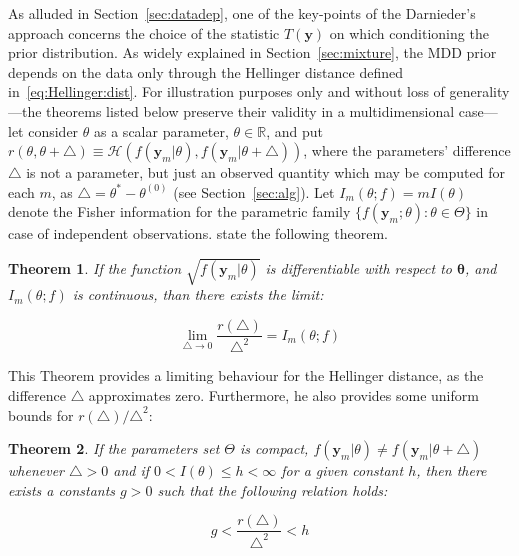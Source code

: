 \documentclass{statsoc}
\newtheorem{thm}{Theorem}
\begin{document}
 As alluded in Section~\ref{sec:datadep}, one of the key-points of the Darnieder's approach concerns the choice of the statistic $T(\bm{y})$ on which conditioning the prior distribution. As widely explained in Section~\ref{sec:mixture}, the MDD prior depends on the data only through the Hellinger distance defined in~\eqref{eq:Hellinger:dist}. For illustration purposes only and without loss of generality ---the theorems listed below preserve their validity in a multidimensional case--- let consider $\theta$ as a scalar parameter, $\theta \in \mathbb{R}$, and put $r(\theta, \theta + \triangle) \equiv \mathcal{H}( f(\bm{y}_{m}|\theta), f(\bm{y}_{m}|\theta+\triangle))$, where the parameters' difference $\triangle$  is not a parameter, but just an observed quantity which may be computed for each $m$, as $\triangle=\theta^{*}-\theta^{(0)}$ (see Section~\ref{sec:alg}). Let $I_{m}(\theta;f)=mI(\theta) $ denote the Fisher information for the parametric family $\{f(\bm{y}_{m}; \theta): \theta \in \Theta \}$ in case of independent observations. \cite{borovkovmathematical} state the following theorem.

\begin{thm}
If the function $\sqrt{f(\bm{y}_{m}|\theta)}$ is differentiable with respect to $\bm{\theta}$, and $I_{m}(\theta;f) $  is continuous, than there exists the limit:

\begin{equation}
\lim_{\triangle \rightarrow 0} \frac{r(\triangle)}{\triangle^{2}}=I_{m}(\theta;f) 
\end{equation}
\label{eq:thm_4}
\end{thm}


This Theorem provides a limiting behaviour for the Hellinger distance, as the difference $\triangle$ approximates zero. Furthermore, he also provides some uniform bounds for  $r(\triangle)/\triangle^{2}$:

\begin{thm}

If the parameters set $\Theta$ is compact, $f(\bm{y}_{m}| \theta) \ne f(\bm{y}_{m}| \theta+\triangle)$ whenever $\triangle >0$ and if $0 < I(\theta)\le h < \infty$ for a given constant $h$, then there exists a constants $g>0$ such that the following relation holds:

\begin{equation}
g < \frac{r(\triangle)}{\triangle^{2}}< h
\label{eq:unoform_bounds}
\end{equation}
\label{eq:thm_5}
\end{thm}
\end{document}
